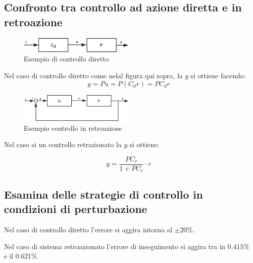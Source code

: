 \subsection{Confronto tra controllo ad azione diretta e in retroazione}

\begin{figure}[h!]
  \begin{center}
    \includegraphics[width=0.5\textwidth]{images/controllo_diretto.png}
  \end{center}
  \caption{Esempio di controllo diretto}
  \label{fig:controllo_diretto}
\end{figure}

Nel caso di controllo diretto come nelal figura qui sopra, la $y$ si ottiene facendo:
\begin{equation}
  y = Pu = P (C_d r) = PC_d r 
  \label{eq:eq_controllo_diretto}
\end{equation}


\begin{figure}[h!]
  \begin{center}
    \includegraphics[width=0.5\textwidth]{images/controllo_retrazione.png}
  \end{center}
  \caption{Esempio controllo in retroazione}
  \label{fig:controllo_retrazione}
\end{figure}

Nel caso si un controllo retrazionato la $y$ si ottiene:

\begin{equation}
  y = \displaystyle\frac{PC_r}{1 + PC_r} \cdot r
  \label{eq:eq_controllo_retrazionato}
\end{equation}





\subsection{Esamina delle strategie di controllo in condizioni di perturbazione}

Nel caso di controllo diretto l'errore si aggira intorno al $\pm 20\%$.

Nel caso di sistema retroazionato l'errore di inseguimento si aggira tra in $0.415\%$ e il $0.621\%$.



